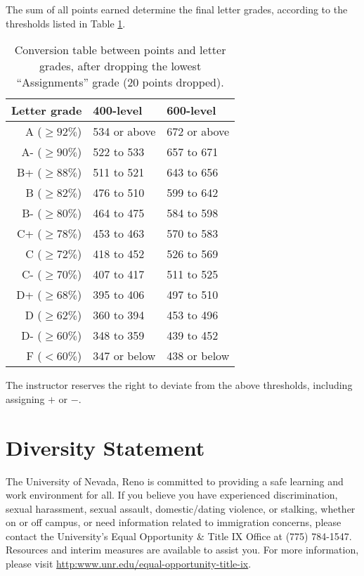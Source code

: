 \documentclass[11pt,onecolumn]{article}
\begin{document}
The sum of all points earned determine the final letter grades, according to the thresholds listed in Table \ref{tab:grade}.

\begin{table}[h]
\begin{center}
  \begin{tabular}{r|l|l}
    Letter grade &400-level& 600-level\\\hline\hline
    A ($\geq 92\%$)&534 or above&672 or above\\
    A- ($\geq 90\%$)&522 to 533&657 to 671\\
    B+ ($\geq 88\%$)&511 to 521&643 to 656\\
    B ($\geq 82\%$)&476 to 510&599 to 642\\
    B- ($\geq 80\%$)&464 to 475&584 to 598\\
    C+ ($\geq 78\%$)&453 to 463&570 to 583\\
    C ($\geq 72\%$)&418 to 452&526 to 569\\
    C- ($\geq 70\%$)&407 to 417&511 to 525\\
    D+ ($\geq 68\%$)&395 to 406&497 to 510\\
    D ($\geq 62\%$)&360 to 394&453 to 496\\
    D- ($\geq 60\%$)&348 to 359&439 to 452\\
    F ($< 60\%$)&347 or below&438 or below
  \end{tabular}
  \caption{Conversion table between points and letter grades, after dropping the lowest ``Assignments'' grade (20 points dropped).\label{tab:grade}}
\end{center}

\end{table}

The instructor reserves the right to deviate from the above thresholds, including assigning $+$ or $-$.

\section*{Diversity Statement}
The University of Nevada, Reno is committed to providing a safe learning and work environment for all. If you believe you have experienced discrimination, sexual harassment, sexual assault, domestic/dating violence, or stalking, whether on or off campus, or need information related to immigration concerns, please contact the University’s Equal Opportunity \& Title IX Office at (775) 784-1547. Resources and interim measures are available to assist you. For more information, please visit \url{http:www.unr.edu/equal-opportunity-title-ix}.
\end{document}
